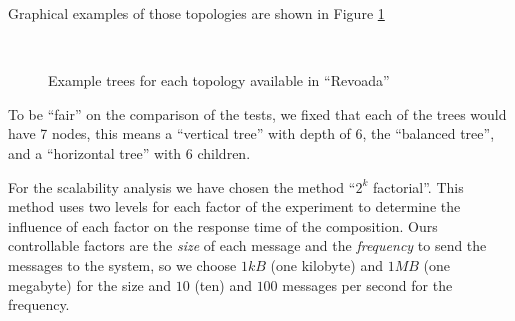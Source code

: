 Graphical examples of those topologies are shown in Figure \ref{trees}

\begin{figure}[htb]
	\centering
	 \qquad
	 \\
	\caption{Example trees for each topology available in ``Revoada''}%
	\label{trees}
\end{figure}


To be ``fair'' on the comparison of the tests, we fixed that each of the trees would have 7 nodes, this means a ``vertical tree'' with depth of 6, the ``balanced tree'', and a ``horizontal tree'' with 6 children.

For the scalability analysis we have chosen the method ``$2^k$ factorial''. This method uses two levels for each factor of the experiment to determine the influence of each factor on the response time of the composition. Ours controllable factors are the \emph{size} of each message and the \emph{frequency} to send the messages to the system, so we choose $1 kB$ (one kilobyte) and $1 MB$ (one megabyte) for the size and $10$ (ten) and $100$ messages per second for the frequency.

